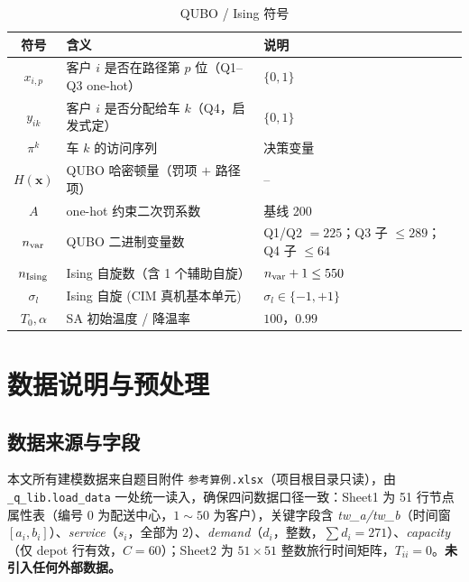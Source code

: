\documentclass[UTF8,12pt,a4paper]{ctexart}
\begin{document}
\begin{table}[H]
    \centering
    \caption{QUBO / Ising 符号}
    \label{tab:sym-qubo}
    \begin{tabular}{c l l}
        \toprule
        符号 & 含义 & 说明 \\
        \midrule
        $x_{i,p}$        & 客户 $i$ 是否在路径第 $p$ 位（Q1--Q3 one-hot）   & $\{0,1\}$ \\
        $y_{ik}$         & 客户 $i$ 是否分配给车 $k$（Q4，启发式定）        & $\{0,1\}$ \\
        $\pi^{k}$        & 车 $k$ 的访问序列                               & 决策变量 \\
        $H(\mathbf{x})$  & QUBO 哈密顿量（罚项 $+$ 路径项）                 & -- \\
        $A$              & one-hot 约束二次罚系数                            & 基线 200 \\
        $n_{\rm var}$    & QUBO 二进制变量数                                & Q1/Q2 $=225$；Q3 子 $\le 289$；Q4 子 $\le 64$ \\
        $n_{\rm Ising}$  & Ising 自旋数（含 1 个辅助自旋）                  & $n_{\rm var}+1\le 550$ \\
        $\sigma_l$       & Ising 自旋 (CIM 真机基本单元)                   & $\sigma_l\!\in\!\{-1,+1\}$ \\
        $T_0,\alpha$     & SA 初始温度 / 降温率                             & $100$，$0.99$ \\
        \bottomrule
    \end{tabular}
\end{table}

\section{数据说明与预处理}

\subsection{数据来源与字段}

本文所有建模数据来自题目附件\cite{problem2026} \texttt{参考算例.xlsx}（项目根目录只读），由 \texttt{\_q\_lib.load\_data} 一处统一读入，确保四问数据口径一致：Sheet1 为 51 行节点属性表（编号 $0$ 为配送中心，$1\!\sim\!50$ 为客户），关键字段含 \textit{tw\_a/tw\_b}（时间窗 $[a_i,b_i]$）、\textit{service}（$s_i$，全部为 $2$）、\textit{demand}（$d_i$，整数，$\sum d_i=271$）、\textit{capacity}（仅 depot 行有效，$C=60$）；Sheet2 为 $51\!\times\!51$ 整数旅行时间矩阵，$T_{ii}=0$。\textbf{未引入任何外部数据。}
\end{document}
